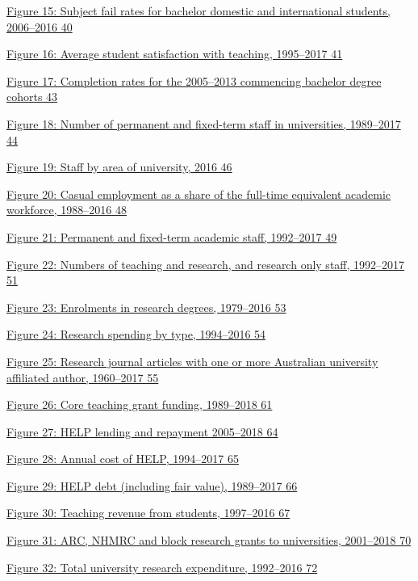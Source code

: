 \documentclass[]{book}
\begin{document}
\protect\hyperlink{_Ref520361791}{Figure 15: Subject fail rates for bachelor domestic and international students, 2006--2016 40}

\protect\hyperlink{_Ref520364329}{Figure 16: Average student satisfaction with teaching, 1995--2017 41}

\protect\hyperlink{_Ref519596476}{Figure 17: Completion rates for the 2005--2013 commencing bachelor degree cohorts 43}

\protect\hyperlink{_Ref395782462}{Figure 18: Number of permanent and fixed-term staff in universities, 1989--2017 44}

\protect\hyperlink{_Ref518912756}{Figure 19: Staff by area of university, 2016 46}

\protect\hyperlink{_Ref518737511}{Figure 20: Casual employment as a share of the full-time equivalent academic workforce, 1988--2016 48}

\protect\hyperlink{_Ref520194625}{Figure 21: Permanent and fixed-term academic staff, 1992--2017 49}

\protect\hyperlink{_Ref345406636}{Figure 22: Numbers of teaching and research, and research only staff, 1992--2017 51}

\protect\hyperlink{_Toc523322083}{Figure 23: Enrolments in research degrees, 1979--2016 53}

\protect\hyperlink{_Toc523322084}{Figure 24: Research spending by type, 1994--2016 54}

\protect\hyperlink{_Ref311633596}{Figure 25: Research journal articles with one or more Australian university affiliated author, 1960--2017 55}

\protect\hyperlink{_Ref519005469}{Figure 26: Core teaching grant funding, 1989--2018 61}

\protect\hyperlink{_Ref452806660}{Figure 27: HELP lending and repayment 2005--2018 64}

\protect\hyperlink{_Ref453350703}{Figure 28: Annual cost of HELP, 1994--2017 65}

\protect\hyperlink{_Ref452807341}{Figure 29: HELP debt (including fair value), 1989--2017 66}

\protect\hyperlink{_Ref311649015}{Figure 30: Teaching revenue from students, 1997--2016 67}

\protect\hyperlink{_Ref452049331}{Figure 31: ARC, NHMRC and block research grants to universities, 2001--2018 70}

\protect\hyperlink{_Ref453257516}{Figure 32: Total university research expenditure, 1992--2016 72}
\end{document}
